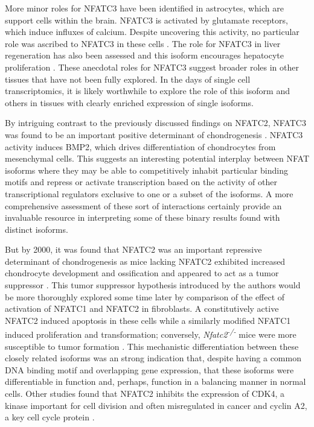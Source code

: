 More minor roles for NFATC3 have been identified in astrocytes, which are support cells within the brain. NFATC3 is activated by glutamate receptors, which induce influxes of calcium. Despite uncovering this activity, no particular role was ascribed to NFATC3 in these cells \citep{Jones2003}. The role for NFATC3 in liver regeneration has also been assessed and this isoform encourages hepatocyte proliferation \citep{Pierre2009}. These anecdotal roles for NFATC3 suggest broader roles in other tissues that have not been fully explored. In the days of single cell transcriptomics, it is likely worthwhile to explore the role of this isoform and others in tissues with clearly enriched expression of single isoforms.

By intriguing contrast to the previously discussed findings on NFATC2, NFATC3 was found to be an important positive determinant of chondrogenesis \citep{Ranger2000, Tomita2002}. NFATC3 activity induces BMP2, which drives differentiation of chondrocytes from mesenchymal cells. This suggests an interesting potential interplay between NFAT isoforms where they may be able to competitively inhabit particular binding motifs and repress or activate transcription based on the activity of other transcriptional regulators exclusive to one or a subset of the isoforms. A more comprehensive assessment of these sort of interactions certainly provide an invaluable resource in interpreting some of these binary results found with distinct isoforms.

But by 2000, it was found that NFATC2 was an important repressive determinant of chondrogenesis as mice lacking NFATC2 exhibited increased chondrocyte development and ossification and appeared to act as a tumor suppressor \citep{Ranger2000}. This tumor suppressor hypothesis introduced by the authors would be more thoroughly explored some time later by comparison of the effect of activation of NFATC1 and NFATC2 in fibroblasts. A constitutively active NFATC2 induced apoptosis in these cells while a similarly modified NFATC1 induced proliferation and transformation; conversely, \textit{Nfatc2\textsuperscript{\hyp{}/\hyp{}}} mice were more susceptible to tumor formation \citep{Robbs2008}. This mechanistic differentiation between these closely related isoforms was an strong indication that, despite having a common DNA binding motif and overlapping gene expression, that these isoforms were differentiable in function and, perhaps, function in a balancing manner in normal cells. Other studies found that NFATC2 inhibits the expression of CDK4, a kinase important for cell division and often misregulated in cancer \citep{Baksh2002, OLeary2016} and cyclin A2, a key cell cycle protein \citep{Carvalho2007}.    

